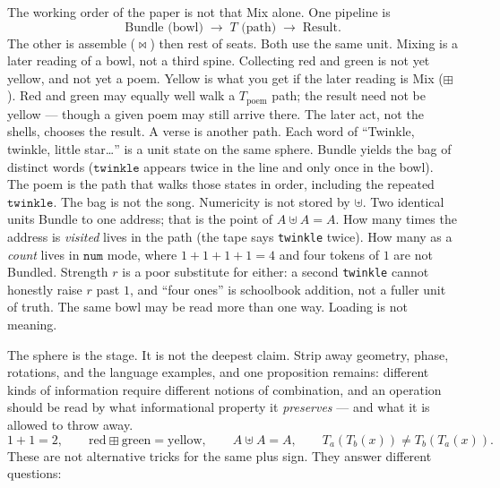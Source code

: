 \documentclass[12pt, a4paper]{article}
\begin{document}
The working order of the paper is not that Mix alone. One pipeline is
\[
\text{Bundle (bowl)} \;\longrightarrow\; T\text{ (path)} \;\longrightarrow\; \text{Result}.
\]
The other is assemble ($\bowtie$) then rest of seats. Both use the
same unit. Mixing is a later reading of a bowl, not a third spine.
Collecting red and green is not yet yellow, and not yet a poem.
Yellow is what you get if the later reading is Mix ($\boxplus$).
Red and green may equally well walk a $T_{\mathrm{poem}}$ path; the
result need not be yellow --- though a given poem may still arrive
there. The later act, not the shells, chooses the result. A verse is
another path.
Each word of ``Twinkle, twinkle, little star\ldots'' is a unit state
on the same sphere. Bundle yields the bag of distinct words
($\texttt{twinkle}$ appears twice in the line and only once in the
bowl). The poem is the path that walks those states in order,
including the repeated $\texttt{twinkle}$. The bag is not the song.
Numericity is not stored by $\uplus$. Two identical units Bundle
to one address; that is the point of $A\uplus A=A$. How many times
the address is \emph{visited} lives in the path (the tape says
\texttt{twinkle} twice). How many as a \emph{count} lives in
$\mathtt{num}$ mode, where $1+1+1+1=4$ and four tokens of $1$ are
not Bundled. Strength $r$ is a poor substitute for either: a
second \texttt{twinkle} cannot honestly raise $r$ past $1$, and
``four ones'' is schoolbook addition, not a fuller unit of truth.
The same bowl may be read more than one way. Loading is not meaning.

The sphere is the stage. It is not the deepest claim. Strip away
geometry, phase, rotations, and the language examples, and one
proposition remains: different kinds of information require different
notions of combination, and an operation should be read by what
informational property it \emph{preserves} --- and what it is allowed
to throw away.
\[
1+1=2,
\qquad
\mathrm{red}\boxplus\mathrm{green}=\mathrm{yellow},
\qquad
A\uplus A=A,
\qquad
T_a(T_b(x))\neq T_b(T_a(x)).
\]
These are not alternative tricks for the same plus sign. They answer
different questions:
\end{document}
